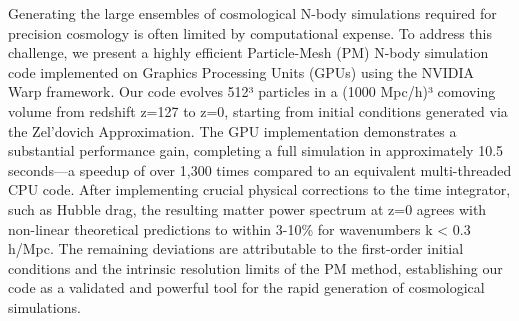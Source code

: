 \documentclass[]{article}
\begin{document}
Generating the large ensembles of cosmological N-body simulations required for precision cosmology is often limited by computational expense. To address this challenge, we present a highly efficient Particle-Mesh (PM) N-body simulation code implemented on Graphics Processing Units (GPUs) using the NVIDIA Warp framework. Our code evolves 512³ particles in a (1000 Mpc/h)³ comoving volume from redshift z=127 to z=0, starting from initial conditions generated via the Zel'dovich Approximation. The GPU implementation demonstrates a substantial performance gain, completing a full simulation in approximately 10.5 seconds—a speedup of over 1,300 times compared to an equivalent multi-threaded CPU code. After implementing crucial physical corrections to the time integrator, such as Hubble drag, the resulting matter power spectrum at z=0 agrees with non-linear theoretical predictions to within 3-10\% for wavenumbers k < 0.3 h/Mpc. The remaining deviations are attributable to the first-order initial conditions and the intrinsic resolution limits of the PM method, establishing our code as a validated and powerful tool for the rapid generation of cosmological simulations.
\end{document}
